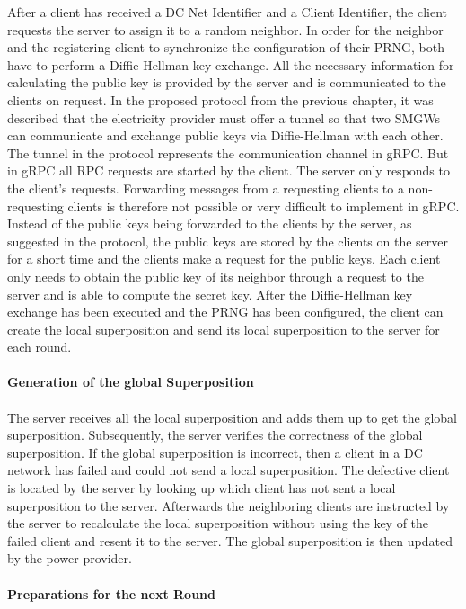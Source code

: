 After a client has received a DC Net Identifier and a Client Identifier, the client requests the server to assign it to a random neighbor. In order for the neighbor and the registering client to synchronize the configuration of their PRNG, both have to perform a Diffie-Hellman key exchange. All the necessary information for calculating the public key is provided by the server and is communicated to the clients on request. In the proposed protocol from the previous chapter, it was described that the electricity provider must offer a tunnel so that two \gls{SMGW}s can communicate and exchange public keys via Diffie-Hellman with each other. The tunnel in the protocol represents the communication channel in gRPC. But in gRPC all RPC requests are started by the client. The server only responds to the client's requests. Forwarding messages from a requesting clients to a non-requesting clients is therefore not possible or very difficult to implement in gRPC. Instead of the public keys being forwarded to the clients by the server, as suggested in the protocol, the public keys are stored by the clients on the server for a short time and the clients make a request for the public keys. 
Each client only needs to obtain the public key of its neighbor through a request to the server and is able to compute the secret key. After the Diffie-Hellman key exchange has been executed and the PRNG has been configured, the client can create the local superposition and send its local superposition to the server for each round. 
\\
\\
\textbf{Generation of the global Superposition}
\\
\\
The server receives all the local superposition and adds them up to get the global superposition. Subsequently, the server verifies the correctness of the global superposition. If the global superposition is incorrect, then a client in a DC network has failed and could not send a local superposition. The defective client is located by the server by looking up which client has not sent a local superposition to the server. Afterwards the neighboring clients are instructed by the server to recalculate the local superposition without using the key of the failed client and resent it to the server. The global superposition is then updated by the power provider. \\
\\
\textbf{Preparations for the next Round}
\\
\\
